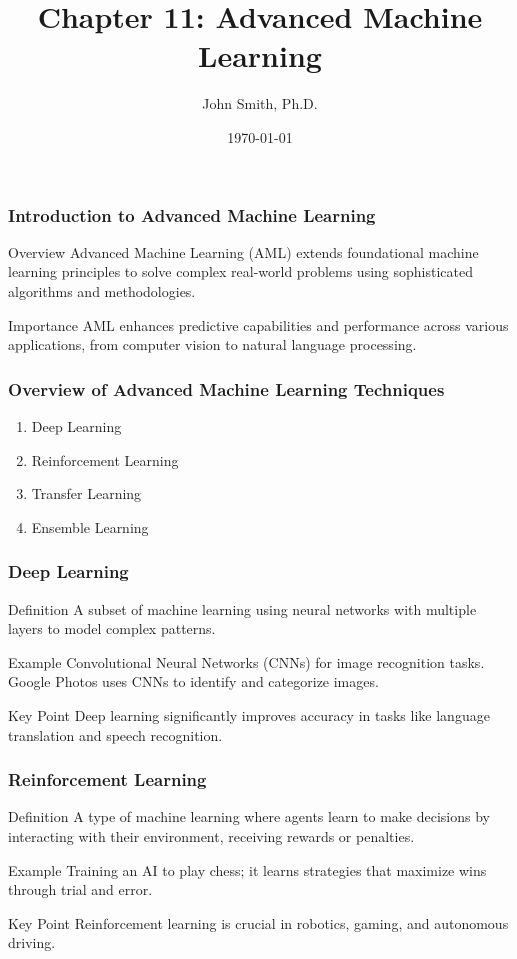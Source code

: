 \documentclass[aspectratio=169]{beamer}
\title[Chapter 11: Advanced Machine Learning]{Chapter 11: Advanced Machine Learning}
\author[J. Smith]{John Smith, Ph.D.}
\institute[University Name]{
  Department of Computer Science\\
  University Name\\
  \vspace{0.3cm}
  Email: email@university.edu\\
  Website: www.university.edu
}
\date{\today}
\begin{document}
\frame{\titlepage}

\begin{frame}[fragile]
    \frametitle{Introduction to Advanced Machine Learning}
    \begin{block}{Overview}
        Advanced Machine Learning (AML) extends foundational machine learning principles to solve complex real-world problems using sophisticated algorithms and methodologies. 
    \end{block}
    \begin{block}{Importance}
        AML enhances predictive capabilities and performance across various applications, from computer vision to natural language processing.
    \end{block}
\end{frame}

\begin{frame}[fragile]
    \frametitle{Overview of Advanced Machine Learning Techniques}
    \begin{enumerate}
        \item Deep Learning
        \item Reinforcement Learning
        \item Transfer Learning
        \item Ensemble Learning
    \end{enumerate}
\end{frame}

\begin{frame}[fragile]
    \frametitle{Deep Learning}
    \begin{block}{Definition}
        A subset of machine learning using neural networks with multiple layers to model complex patterns.
    \end{block}
    \begin{exampleblock}{Example}
        Convolutional Neural Networks (CNNs) for image recognition tasks. Google Photos uses CNNs to identify and categorize images.
    \end{exampleblock}
    \begin{block}{Key Point}
        Deep learning significantly improves accuracy in tasks like language translation and speech recognition.
    \end{block}
\end{frame}

\begin{frame}[fragile]
    \frametitle{Reinforcement Learning}
    \begin{block}{Definition}
        A type of machine learning where agents learn to make decisions by interacting with their environment, receiving rewards or penalties.
    \end{block}
    \begin{exampleblock}{Example}
        Training an AI to play chess; it learns strategies that maximize wins through trial and error.
    \end{exampleblock}
    \begin{block}{Key Point}
        Reinforcement learning is crucial in robotics, gaming, and autonomous driving.
    \end{block}
\end{frame}
\end{document}
